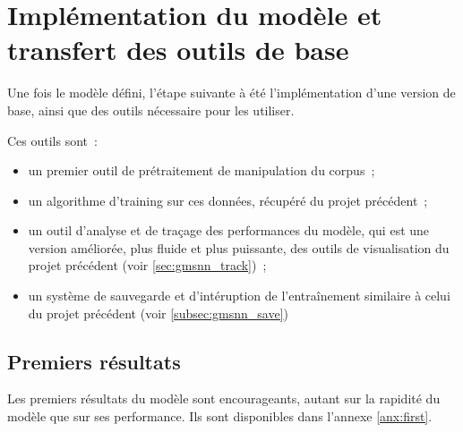 \section{Implémentation du modèle et transfert des outils de base}
Une fois le modèle défini, l'étape suivante à été l'implémentation d'une version de base, ainsi que des outils nécessaire pour les utiliser.

Ces outils sont~:
\begin{itemize}
	\item un premier outil de prétraitement de manipulation du \gls{corpus}~;
	\item un algorithme d'\gls{training} sur ces données, récupéré du projet précédent~;
	\item un outil d'analyse et de traçage des performances du modèle, qui est une version améliorée, plus fluide et plus puissante, des outils de visualisation du projet précédent (voir \autoref{sec:gmsnn_track})~;
	\item un système de sauvegarde et d'intéruption de l'entraînement similaire à celui du projet précédent (voir \autoref{subsec:gmsnn_save})
\end{itemize}

\subsection{Premiers résultats}
Les premiers résultats du modèle sont encourageants, autant sur la rapidité du modèle que sur ses performance.
Ils sont disponibles dans l'annexe \ref{anx:first}.
